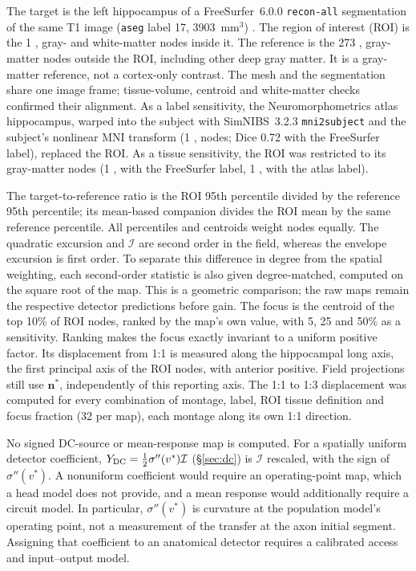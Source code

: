 \documentclass[11pt,a4paper]{article}
\newcommand{\Sig}{\sigma}
\providecommand{\DIFaddtex}[1]{{\protect\color{blue} \sf #1}} %
\providecommand{\DIFadd}[1]{\texorpdfstring{\DIFaddtex{#1}}{#1}} %
\begin{document}
\DIFadd{The target is the left hippocampus of a FreeSurfer~6.0.0 \texttt{recon-all}
segmentation of the same T1 image (\texttt{aseg} label 17, 3903~mm$^3$)
\cite{fischl2002}. The region of interest (ROI) is the 1}{\DIFadd{,}}\DIFadd{568 gray- and white-matter
nodes inside it. The reference is the 273}{\DIFadd{,}}\DIFadd{544 gray-matter nodes outside the
ROI, including other deep gray matter. It is a gray-matter reference, not a cortex-only contrast.
The mesh and the segmentation share one image frame; tissue-volume, centroid and
white-matter checks confirmed their alignment. As a label sensitivity, the
Neuromorphometrics atlas hippocampus, warped into the subject with SimNIBS~3.2.3
\texttt{mni2subject} and the subject's nonlinear MNI transform (1}{\DIFadd{,}}\DIFadd{345 nodes; Dice 0.72
with the FreeSurfer label), replaced the ROI. As a tissue sensitivity, the ROI was
restricted to its gray-matter nodes (1}{\DIFadd{,}}\DIFadd{174 with the FreeSurfer label, 1}{\DIFadd{,}}\DIFadd{013 with
the atlas label).
}

\DIFadd{The target-to-reference ratio is the ROI 95th percentile divided by the reference
95th percentile; its mean-based companion divides the ROI mean by the same
reference percentile. All percentiles and centroids weight nodes equally.
The quadratic excursion and $\mathcal I$ are second order in the field, whereas
the envelope excursion is first order. To separate this difference in degree
from the spatial weighting, each second-order statistic is also given
degree-matched, computed on the square root of the map. This is a geometric
comparison; the raw maps remain the respective detector predictions before gain.
The focus is the centroid of the top 10\% of ROI nodes,
ranked by the map's own value, with 5, 25 and 50\% as a sensitivity. Ranking makes the
focus exactly invariant to a uniform positive factor. Its displacement from 1:1 is
measured along the hippocampal long axis, the first principal axis of the ROI nodes,
with anterior positive. Field projections still use $\mathbf n^*$, independently
of this reporting axis. The 1:1 to 1:3 displacement was computed for every combination
of montage, label, ROI tissue definition and focus fraction (32 per map), each montage
along its own 1:1 direction.
}

\DIFadd{No signed DC-source or mean-response map is computed. For a spatially uniform detector
coefficient, $Y_{\rm DC}=\tfrac12\Sig''(v^*)\mathcal I$ (\S\ref{sec:dc}) is
$\mathcal I$ rescaled, with the sign of $\Sig''(v^*)$. A nonuniform coefficient would
require an operating-point map, which a head model does not provide, and a mean
response would additionally require a circuit model. In particular,
$\Sig''(v^*)$ is curvature at the population model's operating point, not a
measurement of the transfer at the axon initial segment. Assigning that
coefficient to an anatomical detector requires a calibrated access and
input--output model.
}
\end{document}
